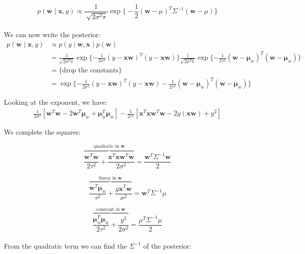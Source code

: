 \documentclass[12pt]{article}
\newenvironment{question}[2][Question]{\begin{trivlist}
\kern10pt
\item[\hskip \labelsep {\bfseries #1}\hskip \labelsep {\bfseries #2.}]}{\end{trivlist}}
\begin{document}
\begin{question}{6}
\begin{equation}
p(\boldsymbol{w} \mid \boldsymbol{x}, y) \propto \frac{1}{\sqrt[]{2\sigma^2\pi}}\exp\Big\{-\frac{1}{2}(\boldsymbol{w} - \mu)^T\Sigma^{-1}(\boldsymbol{w} - \mu)\Big\}
\end{equation}
\\
We can now write the posterior:
\begin{equation}
\begin{split}
p(\boldsymbol{w} \mid \boldsymbol{x}, y) 
&\propto p(y \mid \boldsymbol{w}, \boldsymbol{x}) p(\boldsymbol{w})
\\
&= \frac{1}{\sqrt{2\sigma^2\pi}}\exp{\{-\frac{1}{2\sigma^2}(y-\boldsymbol{x}\boldsymbol{w})^T(y-\boldsymbol{x}\boldsymbol{w})\}\frac{1}{\sqrt{2\sigma^2\pi}}\exp{\{-\frac{1}{2\tau^2}(\boldsymbol{w}-\boldsymbol{\mu}_w)^T(\boldsymbol{w}-\boldsymbol{\mu}_w)\}}} \\
&= \Big\{ \text{drop the constants} \Big\}\\
&= \exp{\{-\frac{1}{2\sigma^2}(y-\boldsymbol{x}\boldsymbol{w})^T(y-\boldsymbol{x}\boldsymbol{w}) -\frac{1}{2\tau^2}(\boldsymbol{w}-\boldsymbol{\mu}_w)^T(\boldsymbol{w}-\boldsymbol{\mu}_w)\}}
\end{split}
\end{equation}

Looking at the exponent, we have:
\begin{align}
\frac{1}{2\sigma^2}[\boldsymbol{w}^T\boldsymbol{w} - 2\boldsymbol{w}^T\boldsymbol{\mu}_w + \boldsymbol{\mu}_w^T\boldsymbol{\mu}_w] - \frac{1}{2\tau^2}[\boldsymbol{x}^T \boldsymbol{x} \boldsymbol{w}^T \boldsymbol{w} - 2y(\boldsymbol{x}\boldsymbol{w}) + y^2]
\end{align}

We complete the squares:

\begin{equation}
\overbrace{
\frac{\boldsymbol{w}^T\boldsymbol{w}}{2\tau^2} + 
\frac{\boldsymbol{x}^T\boldsymbol{x}\boldsymbol{w}^T\boldsymbol{w}}{2\sigma^2} 
}^{\text{quadratic in $\boldsymbol{w}$}}
= \frac{\boldsymbol{w}^T\Sigma^{-1}\boldsymbol{w}}{2}
\end{equation}

\begin{equation}
\overbrace{
\frac{\boldsymbol{w}^T\boldsymbol{\mu}_w}{\tau^2} + \frac{y\boldsymbol{x}^T\boldsymbol{w}}{\sigma^2}
}^\text{linear in $\boldsymbol{w}$}
= \boldsymbol{w}^T\Sigma^{-1}\mu
\end{equation}

\begin{equation}
\overbrace{
\frac{\boldsymbol{\mu}_w^T\boldsymbol{\mu}_w}{2\tau^2} + \frac{y^2}{2\sigma^2}
}^{\text{constant in $\boldsymbol{w}$}}
= \frac{\mu^T\Sigma^{-1}\mu}{2}
\end{equation}
\\
From the quadratic term we can find the $\Sigma^{-1}$ of the posterior:


\end{question}
\end{document}
